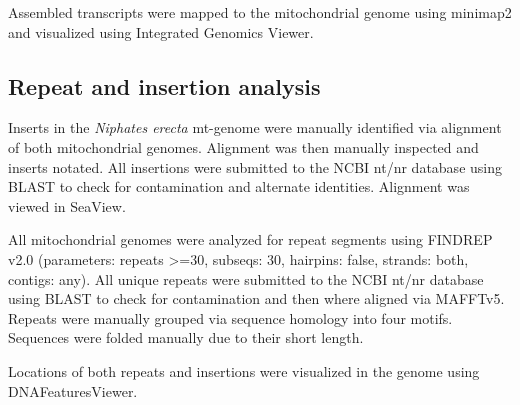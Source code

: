 \documentclass[../main.tex]{subfiles}
\begin{document}
Assembled transcripts were mapped to the mitochondrial genome using minimap2 and visualized using Integrated Genomics Viewer.

\subsection{Repeat and insertion analysis}
Inserts in the \emph{Niphates erecta} mt-genome were manually identified via alignment of both mitochondrial genomes. Alignment was then manually inspected and inserts notated. All insertions were submitted to the NCBI nt/nr database using BLAST to check for contamination and alternate identities. Alignment was viewed in SeaView.

All mitochondrial genomes were analyzed for repeat segments using FINDREP v2.0 (parameters: repeats >=30, subseqs: 30, hairpins: false, strands: both, contigs: any). All unique repeats were submitted to the NCBI nt/nr database using BLAST to check for contamination and then where aligned via MAFFTv5. Repeats were manually grouped via sequence homology into four motifs. Sequences were folded manually due to their short length. 

Locations of both repeats and insertions were visualized in the genome using DNAFeaturesViewer. 
\end{document}
